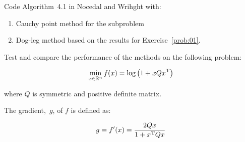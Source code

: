 \begin{problem}
  Code Algorithm~4.1 in Nocedal and Wrihght with:
  
  \begin{enumerate}
    \item Cauchy point method for the subproblem
    \item Dog-leg method based on the results for Exercise~\ref{prob:01}.
  \end{enumerate}

  \noindent
  Test and compare the performance of the methods on the following problem:
  
  \[\min_{x\in \mathbb{R}^n} f(x) = \log\left(1+xQx^{\textnormal{T}}\right)\]
  
  \noindent
  where $Q$ is symmetric and positive definite matrix.
\end{problem}


The gradient,~$g$, of $f$ is defined as: 

\[g = f'(x) = \frac{2Qx}{1+x^{\textnormal{T}} Q x}\]